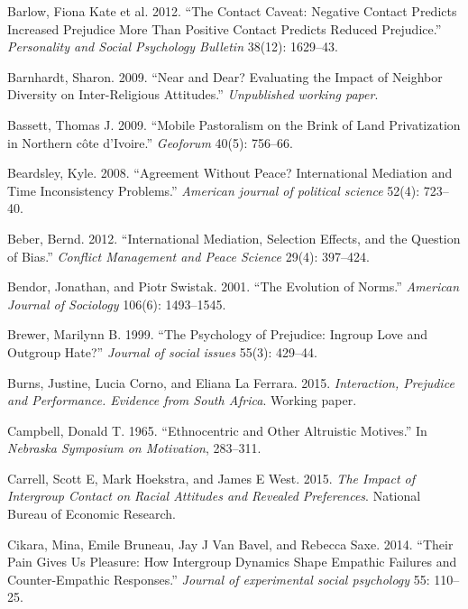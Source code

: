 \documentclass[11pt]{article}
\begin{document}
\leavevmode\hypertarget{ref-barlow2012contact}{}%
Barlow, Fiona Kate et al. 2012. ``The Contact Caveat: Negative Contact
Predicts Increased Prejudice More Than Positive Contact Predicts Reduced
Prejudice.'' \emph{Personality and Social Psychology Bulletin} 38(12):
1629--43.

\leavevmode\hypertarget{ref-barnhardt2009near}{}%
Barnhardt, Sharon. 2009. ``Near and Dear? Evaluating the Impact of
Neighbor Diversity on Inter-Religious Attitudes.'' \emph{Unpublished
working paper}.

\leavevmode\hypertarget{ref-bassett2009mobile}{}%
Bassett, Thomas J. 2009. ``Mobile Pastoralism on the Brink of Land
Privatization in Northern côte d'Ivoire.'' \emph{Geoforum} 40(5):
756--66.

\leavevmode\hypertarget{ref-beardsley2008agreement}{}%
Beardsley, Kyle. 2008. ``Agreement Without Peace? International
Mediation and Time Inconsistency Problems.'' \emph{American journal of
political science} 52(4): 723--40.

\leavevmode\hypertarget{ref-beber2012international}{}%
Beber, Bernd. 2012. ``International Mediation, Selection Effects, and
the Question of Bias.'' \emph{Conflict Management and Peace Science}
29(4): 397--424.

\leavevmode\hypertarget{ref-bendor2001evolution}{}%
Bendor, Jonathan, and Piotr Swistak. 2001. ``The Evolution of Norms.''
\emph{American Journal of Sociology} 106(6): 1493--1545.

\leavevmode\hypertarget{ref-brewer1999ingroupOutgroup}{}%
Brewer, Marilynn B. 1999. ``The Psychology of Prejudice: Ingroup Love
and Outgroup Hate?'' \emph{Journal of social issues} 55(3): 429--44.

\leavevmode\hypertarget{ref-burns2015interaction}{}%
Burns, Justine, Lucia Corno, and Eliana La Ferrara. 2015.
\emph{Interaction, Prejudice and Performance. Evidence from South
Africa}. Working paper.

\leavevmode\hypertarget{ref-campbell1965ethno}{}%
Campbell, Donald T. 1965. ``Ethnocentric and Other Altruistic Motives.''
In \emph{Nebraska Symposium on Motivation}, 283--311.

\leavevmode\hypertarget{ref-carrell2015impact}{}%
Carrell, Scott E, Mark Hoekstra, and James E West. 2015. \emph{The
Impact of Intergroup Contact on Racial Attitudes and Revealed
Preferences}. National Bureau of Economic Research.

\leavevmode\hypertarget{ref-cikara2014their}{}%
Cikara, Mina, Emile Bruneau, Jay J Van Bavel, and Rebecca Saxe. 2014.
``Their Pain Gives Us Pleasure: How Intergroup Dynamics Shape Empathic
Failures and Counter-Empathic Responses.'' \emph{Journal of experimental
social psychology} 55: 110--25.
\end{document}
